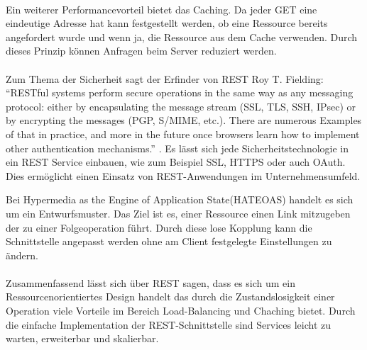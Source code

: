\paragraph{}
Ein weiterer Performancevorteil bietet das Caching. Da jeder GET eine eindeutige Adresse hat kann festgestellt werden, ob eine Ressource bereits angefordert wurde und wenn ja, die  Ressource aus dem Cache verwenden. Durch dieses Prinzip können Anfragen beim Server reduziert werden.
\paragraph{}
Zum Thema der Sicherheit sagt der Erfinder von REST Roy T. Fielding: "`RESTful systems perform secure operations in the same way as any messaging protocol: either by encapsulating the message stream (SSL, TLS, SSH, IPsec) or by encrypting the messages (PGP, S/MIME, etc.). There are numerous Examples of that in practice, and more in the future once browsers learn how to implement other authentication mechanisms."' \cite{fielding2008restapi}. Es lässt sich jede Sicherheitstechnologie in ein REST Service einbauen, wie zum Beispiel  \ac{SSL}, \ac{HTTPS} oder auch OAuth. Dies ermöglicht einen Einsatz von REST-Anwendungen im Unternehmensumfeld.

Bei Hypermedia as the Engine of Application State(\ac{HATEOAS}) handelt es sich um ein Entwurfsmuster. Das Ziel ist es, einer Ressource einen Link mitzugeben der zu einer Folgeoperation führt. Durch diese lose Kopplung kann die Schnittstelle angepasst werden ohne am Client festgelegte Einstellungen zu ändern.
\paragraph{}
Zusammenfassend lässt sich über \ac{REST} sagen, dass es sich um ein Ressourcenorientiertes Design handelt das durch die Zustandslosigkeit einer Operation viele Vorteile im Bereich Load-Balancing und Chaching  bietet. Durch die einfache Implementation der REST-Schnittstelle sind Services leicht zu warten, erweiterbar und skalierbar.
